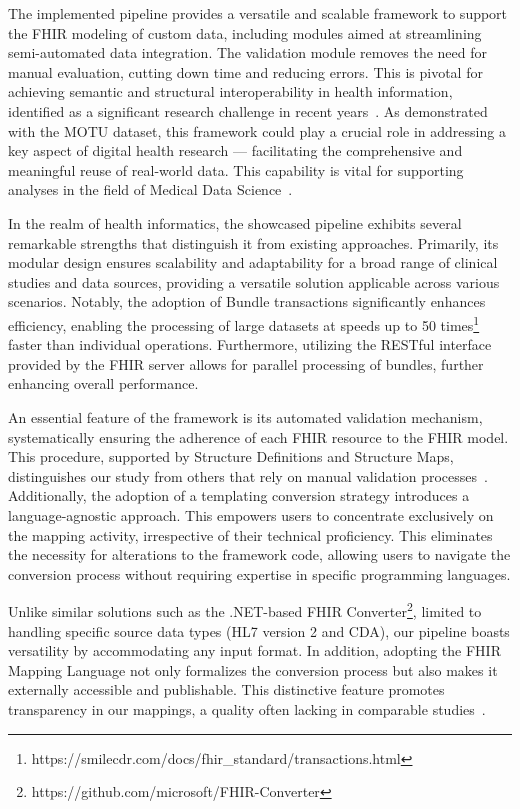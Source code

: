 The implemented pipeline provides a versatile and scalable framework to support the FHIR modeling of custom data, including modules aimed at streamlining semi-automated data integration. The validation module removes the need for manual evaluation, cutting down time and reducing errors. This is pivotal for achieving semantic and structural interoperability in health information, identified as a significant research challenge in recent years~\cite{chatterjee_hl7_2022,kadakia_modernizing_2021}. As demonstrated with the MOTU dataset, this framework could play a crucial role in addressing a key aspect of digital health research — facilitating the comprehensive and meaningful reuse of real-world data. This capability is vital for supporting analyses in the field of Medical Data Science~\cite{gehrmann_what_2023}. 

In the realm of health informatics, the showcased pipeline exhibits several remarkable strengths that distinguish it from existing approaches. Primarily, its modular design ensures scalability and adaptability for a broad range of clinical studies and data sources, providing a versatile solution applicable across various scenarios. Notably, the adoption of Bundle transactions significantly enhances efficiency, enabling the processing of large datasets at speeds up to 50 times\footnote{https://smilecdr.com/docs/fhir\_standard/transactions.html} faster than individual operations. Furthermore, utilizing the RESTful interface provided by the FHIR server allows for parallel processing of bundles, further enhancing overall performance. 

An essential feature of the framework is its automated validation mechanism, systematically ensuring the adherence of each FHIR resource to the FHIR model. This procedure, supported by Structure Definitions and Structure Maps, distinguishes our study from others that rely on manual validation processes~\cite{montazeri2023developing}. Additionally, the adoption of a templating conversion strategy introduces a language-agnostic approach. This empowers users to concentrate exclusively on the mapping activity, irrespective of their technical proficiency. This eliminates the necessity for alterations to the framework code, allowing users to navigate the conversion process without requiring expertise in specific programming languages. 

Unlike similar solutions such as the .NET-based FHIR Converter\footnote{https://github.com/microsoft/FHIR-Converter}, limited to handling specific source data types (HL7 version 2 and CDA), our pipeline boasts versatility by accommodating any input format. In addition, adopting the FHIR Mapping Language not only formalizes the conversion process but also makes it externally accessible and publishable. This distinctive feature promotes transparency in our mappings, a quality often lacking in comparable studies~\cite{sinaci2023data,williams2023standardized}. 

